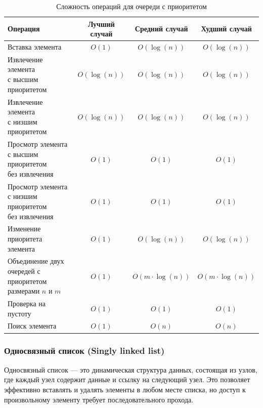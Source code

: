 \documentclass[a4paper,12pt]{article}
\begin{document}
\begin{table}[H]
    \centering
    \begin{tabular}{|l|c|c|c|}
        \hline
        Операция & Лучший случай & Средний случай & Худший случай \\
        \hline
        Вставка элемента & $O(1)$ & $O(\log(n))$ & $O(\log(n))$ \\
        \hline
        \makecell[l]{Извлечение элемента \\с высшим приоритетом} & $O(\log(n))$ & $O(\log(n))$ & $O(\log(n))$ \\
        \hline
        \makecell[l]{Извлечение элемента \\с низшим приоритетом} & $O(\log(n))$ & $O(\log(n))$ & $O(\log(n))$ \\
        \hline
        \makecell[l]{Просмотр элемента \\с высшим приоритетом \\без извлечения} & $O(1)$ & $O(1)$ & $O(1)$ \\
        \hline
        \makecell[l]{Просмотр элемента \\с низшим приоритетом \\без извлечения} & $O(1)$ & $O(1)$ & $O(1)$ \\
        \hline
        \makecell[l]{Изменение приоритета \\элемента} & $O(1)$ & $O(\log(n))$ & $O(\log(n))$ \\
        \hline
        \makecell[l]{Объединение двух \\очередей с приоритетом \\размерами $n$ и $m$} & $O(1)$ & $O(m \cdot \log(n))$ & $O(m \cdot \log(n))$ \\
        \hline
        Проверка на пустоту & $O(1)$ & $O(1)$ & $O(1)$ \\
        \hline
        Поиск элемента & $O(1)$ & $O(n)$ & $O(n)$ \\
        \hline
    \end{tabular}
    \caption{Сложность операций для очереди с приоритетом}
\end{table}

\subsubsection{Односвязный список (Singly linked list)}
\label{subsubsec:односвязный-список-singly-linked-list}

Односвязный список --- это динамическая структура данных, состоящая из узлов, где каждый узел содержит данные и ссылку на следующий узел. Это позволяет эффективно вставлять и удалять элементы в любом месте списка, но доступ к произвольному элементу требует последовательного прохода.
\end{document}
